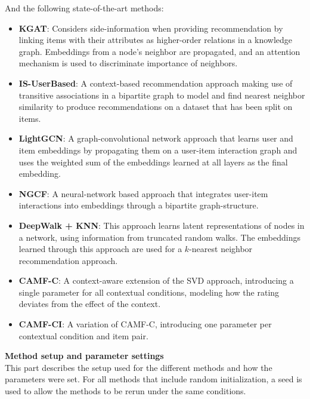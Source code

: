 And the following state-of-the-art methods:
\begin{itemize}
    \item \textbf{KGAT}: Considers side-information when providing recommendation by linking items with their attributes as higher-order relations in a knowledge graph. Embeddings from a node's neighbor are propagated, and an attention mechanism is used to discriminate importance of neighbors.
    \item \textbf{IS-UserBased}: A context-based recommendation approach making use of transitive associations in a bipartite graph to model and find nearest neighbor similarity to produce recommendations on a dataset that has been split on items.
    \item \textbf{LightGCN}: A graph-convolutional network approach that learns user and item embeddings by propagating them on a user-item interaction graph and uses the weighted sum of the embeddings learned at all layers as the final embedding.
    \item \textbf{NGCF}: A neural-network based approach that integrates user-item interactions into embeddings through a bipartite graph-structure.
    \item \textbf{DeepWalk + KNN}: This approach learns latent representations of nodes in a network, using information from truncated random walks. The embeddings learned through this approach are used for a $k$-nearest neighbor recommendation approach.
    \item \textbf{CAMF-C}: A context-aware extension of the SVD approach, introducing a single parameter for all contextual conditions, modeling how the rating deviates from the effect of the context.
    \item \textbf{CAMF-CI}: A variation of CAMF-C, introducing one parameter per contextual condition and item pair.
\end{itemize}
\textbf{Method setup and parameter settings}
\\
This part describes the setup used for the different methods and how the parameters were set.
For all methods that include random initialization, a seed is used to allow the methods to be rerun under the same conditions.

